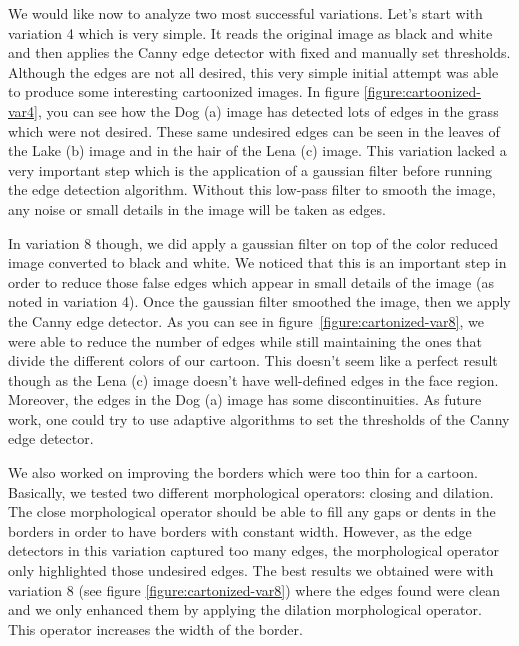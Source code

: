 \documentclass[]{IEEEtran}
\begin{document}
    We would like now to analyze two most successful variations.
    Let's start with variation 4 which is very simple.
    It reads the original image as black and white and then applies the Canny edge detector with fixed and manually set thresholds.
    Although the edges are not all desired, this very simple initial attempt was able to produce some interesting
    cartoonized images. In figure \ref{figure:cartoonized-var4}, you can see how the Dog (a)
    image has detected lots of edges in the grass which were not desired.
    These same undesired edges can be seen in the leaves of the Lake (b) image and in the hair of the Lena (c) image.
    This variation lacked a very important step which is the application of a gaussian filter before running the edge detection algorithm.
    Without this low-pass filter to smooth the image, any noise or small details in the image will be taken as edges.

    In variation 8 though, we did apply a gaussian filter on top of the color reduced image converted to black and white.
    We noticed that this is an important step in order to reduce those false edges which appear
    in small details of the image (as noted in variation 4). Once the gaussian filter smoothed the image,
    then we apply the Canny edge detector. As you can see in figure~\ref{figure:cartonized-var8},
    we were able to reduce the number of edges while still maintaining the ones that divide the different
    colors of our cartoon.
    This doesn't seem like a perfect result though as the Lena (c) image doesn't have well-defined edges in the face region.
    Moreover, the edges in the Dog (a) image has some discontinuities.
    As future work, one could try to use adaptive algorithms to set the thresholds of the Canny edge detector.

    We also worked on improving the borders which were too thin for a cartoon.
    Basically, we tested two different morphological operators: closing and dilation.
    The close morphological operator should be able to fill any gaps or dents in the borders
    in order to have borders with constant width.
    However, as the edge detectors in this variation captured too many edges,
    the morphological operator only highlighted those undesired edges.
    The best results we obtained were with variation 8 (see figure \ref{figure:cartonized-var8})
    where the edges found were clean and we only enhanced them by applying the dilation morphological operator.
    This operator increases the width of the border.
\end{document}
